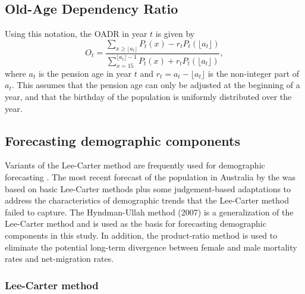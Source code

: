 \documentclass[
  doublespace]{anzsauth}
\begin{document}
\hypertarget{old-age-dependency-ratio}{%
\subsection{Old-Age Dependency Ratio}\label{old-age-dependency-ratio}}

Using this notation, the OADR in year \(t\) is given by
\begin{equation}\label{eq:oadr}
O_t = \frac{\displaystyle\sum_{x\ge \lfloor a_t\rfloor} P_t(x) - r_t P_t(\lfloor a_t\rfloor)}{\displaystyle\sum_{x=15}^{\lfloor a_t\rfloor-1} P_t(x) + r_t P_t(\lfloor a_t\rfloor)},
\end{equation}
where \(a_t\) is the pension age in year \(t\) and \(r_t = a_t - \lfloor a_t \rfloor\) is the non-integer part of \(a_t\). This assumes that the pension age can only be adjusted at the beginning of a year, and that the birthday of the population is uniformly distributed over the year.

\hypertarget{forecasting-demographic-components}{%
\subsection{Forecasting demographic components}\label{forecasting-demographic-components}}

Variants of the Lee-Carter method \citep{LC92} are frequently used for demographic forecasting \citep[see, e.g.,][]{SBH11}. The most recent forecast of the population in Australia by the \citet{PC13} was based on basic Lee-Carter methods plus some judgement-based adaptations to address the characteristics of demographic trends that the Lee-Carter method failed to capture. The Hyndman-Ullah method (2007) is a generalization of the Lee-Carter method and is used as the basis for forecasting demographic components in this study. In addition, the product-ratio method \citep{HBY13} is used to eliminate the potential long-term divergence between female and male mortality rates and net-migration rates.

\hypertarget{lee-carter-method}{%
\subsubsection*{Lee-Carter method}\label{lee-carter-method}}
\end{document}
